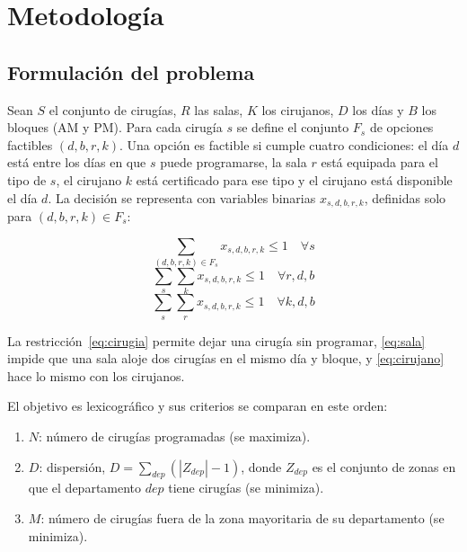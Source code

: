 \section{Metodología}
\label{sec:methodology}

\subsection{Formulación del problema}

Sean $S$ el conjunto de cirugías, $R$ las salas, $K$ los cirujanos, $D$ los días y $B$ los bloques (AM y PM). Para cada cirugía $s$ se define el conjunto $F_s$ de opciones factibles $(d,b,r,k)$. Una opción es factible si cumple cuatro condiciones: el día $d$ está entre los días en que $s$ puede programarse, la sala $r$ está equipada para el tipo de $s$, el cirujano $k$ está certificado para ese tipo y el cirujano está disponible el día $d$. La decisión se representa con variables binarias $x_{s,d,b,r,k}$, definidas solo para $(d,b,r,k)\in F_s$:

\begin{equation}
	\sum_{(d,b,r,k)\in F_s} x_{s,d,b,r,k} \le 1 \quad \forall s
	\label{eq:cirugia}
\end{equation}
\begin{equation}
	\sum_{s}\sum_{k} x_{s,d,b,r,k} \le 1 \quad \forall r,d,b
	\label{eq:sala}
\end{equation}
\begin{equation}
	\sum_{s}\sum_{r} x_{s,d,b,r,k} \le 1 \quad \forall k,d,b
	\label{eq:cirujano}
\end{equation}

La restricción~\eqref{eq:cirugia} permite dejar una cirugía sin programar, \eqref{eq:sala} impide que una sala aloje dos cirugías en el mismo día y bloque, y \eqref{eq:cirujano} hace lo mismo con los cirujanos.

El objetivo es lexicográfico y sus criterios se comparan en este orden:

\begin{enumerate}
	\item $N$: número de cirugías programadas (se maximiza).
	\item $D$: dispersión, $D=\sum_{dep}\left(|Z_{dep}|-1\right)$, donde $Z_{dep}$ es el conjunto de zonas en que el departamento $dep$ tiene cirugías (se minimiza).
	\item $M$: número de cirugías fuera de la zona mayoritaria de su departamento (se minimiza).
\end{enumerate}

